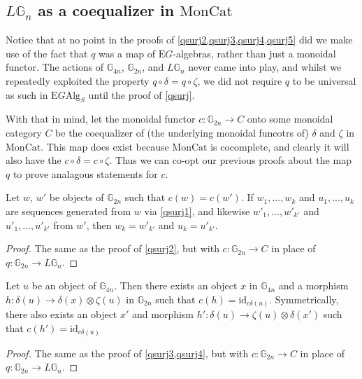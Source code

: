 \subsection{$L\mathbb{G}_n$ as a coequalizer in $\mathrm{MonCat}$}

Notice that at no point in the proofs of \cref{qsurj2,qsurj3,qsurj4,qsurj5} did we make use of the fact that $q$ was a map of $\mathrm{E}G$-algebras, rather than just a monoidal functor. The actions of $\mathbb{G}_{4n}$, $\mathbb{G}_{2n}$, and $L\mathbb{G}_n$ never came into play, and whilst we repeatedly exploited the property $q \circ \delta = q \circ \zeta$, we did not require $q$ to be universal as such in $\mathrm{E}G\mathrm{Alg}_S$ until the proof of \cref{qsurj}.

With that in mind, let the monoidal functor $c: \mathbb{G}_{2n} \to C$ onto some monoidal category $C$ be the coequalizer of (the underlying monoidal funcotrs of) $\delta$ and $\zeta$ in $\mathrm{MonCat}$. This map does exist because $\mathrm{MonCat}$ is cocomplete, and clearly it will also have the $c \circ \delta = c \circ \zeta$. Thus we can co-opt our previous proofs about the map $q$ to prove analagous statements for $c$.

\begin{prop} \label{csurj2} Let $w$, $w'$ be objects of $\mathbb{G}_{2n}$ such that $c(w) = c(w')$. If $w_1, ..., w_k$ and $u_1, ..., u_k$ are sequences generated from $w$ via \cref{qsurj1}, and likewise $w'_1, ..., w'_{k'}$ and $u'_1, ..., u'_{k'}$ from $w'$, then $w_k = w'_{k'}$ and $u_k = u'_{k'}$.
\end{prop}
\begin{proof}
The same as the proof of \cref{qsurj2}, but with $c: \mathbb{G}_{2n} \to C$ in place of $q: \mathbb{G}_{2n} \to L\mathbb{G}_n$.
\end{proof}

\begin{prop} \label{csurj34} Let $u$ be an object of $\mathbb{G}_{4n}$. Then there exists an object $x$ in $\mathbb{G}_{4n}$ and a morphism $h: \delta(u) \to \delta(x) \otimes \zeta(u)$ in $\mathbb{G}_{2n}$ such that $c(h) = \mathrm{id}_{c\delta(u)}$. Symmetrically, there also exists an object $x'$ and morphism $h': \delta(u) \to \zeta(u) \otimes \delta(x')$ such that $c(h') = \mathrm{id}_{c\delta(u)}$
\end{prop}
\begin{proof}
The same as the proof of \cref{qsurj3,qsurj4}, but with $c: \mathbb{G}_{2n} \to C$ in place of $q: \mathbb{G}_{2n} \to L\mathbb{G}_n$.
\end{proof}


